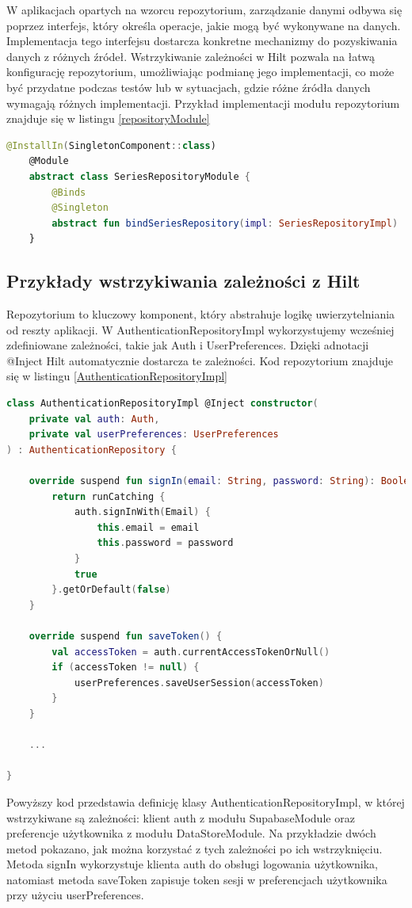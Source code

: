 \documentclass[12pt,twoside]{article}
\begin{document}
W aplikacjach opartych na wzorcu repozytorium, zarządzanie danymi odbywa się poprzez interfejs, który określa 
operacje, jakie mogą być wykonywane na danych. Implementacja tego interfejsu dostarcza konkretne mechanizmy do 
pozyskiwania danych z różnych źródeł. Wstrzykiwanie zależności w Hilt pozwala na łatwą konfigurację repozytorium, 
umożliwiając podmianę jego implementacji, co może być przydatne podczas testów lub w sytuacjach, gdzie różne źródła 
danych wymagają różnych implementacji. Przykład implementacji modułu repozytorium znajduje się w listingu 
\ref{repositoryModule}

\begin{lstlisting}[language=Kotlin,caption=Przykład modułu repozytorium SeriesRepository, label={repositoryModule}]
	@InstallIn(SingletonComponent::class)
	@Module
	abstract class SeriesRepositoryModule {
		@Binds
		@Singleton
		abstract fun bindSeriesRepository(impl: SeriesRepositoryImpl) : SeriesRepository
	}
\end{lstlisting}

\subsection{Przykłady wstrzykiwania zależności z Hilt}

Repozytorium to kluczowy komponent, który abstrahuje logikę uwierzytelniania od reszty aplikacji. W 
AuthenticationRepositoryImpl wykorzystujemy wcześniej zdefiniowane zależności, takie jak Auth i UserPreferences. 
Dzięki adnotacji @Inject Hilt automatycznie dostarcza te zależności. Kod repozytorium znajduje się w listingu 
\ref{AuthenticationRepositoryImpl}

\begin{lstlisting}[language=Kotlin,caption=Implementacja AuthenticationRepository, label={AuthenticationRepositoryImpl}]
	class AuthenticationRepositoryImpl @Inject constructor(
    private val auth: Auth,
    private val userPreferences: UserPreferences
) : AuthenticationRepository {

    override suspend fun signIn(email: String, password: String): Boolean {
        return runCatching {
            auth.signInWith(Email) {
                this.email = email
                this.password = password
            }
            true
        }.getOrDefault(false)
    }

	override suspend fun saveToken() {
        val accessToken = auth.currentAccessTokenOrNull()
        if (accessToken != null) {
            userPreferences.saveUserSession(accessToken)
        }
    }

	...

}
\end{lstlisting}
Powyższy kod przedstawia definicję klasy AuthenticationRepositoryImpl, w której wstrzykiwane są zależności: klient 
auth z modułu SupabaseModule oraz preferencje użytkownika z modułu DataStoreModule. Na przykładzie dwóch metod 
pokazano, jak można korzystać z tych zależności po ich wstrzyknięciu. Metoda signIn wykorzystuje klienta auth do 
obsługi logowania użytkownika, natomiast metoda saveToken zapisuje token sesji w preferencjach użytkownika przy 
użyciu userPreferences.
\end{document}
